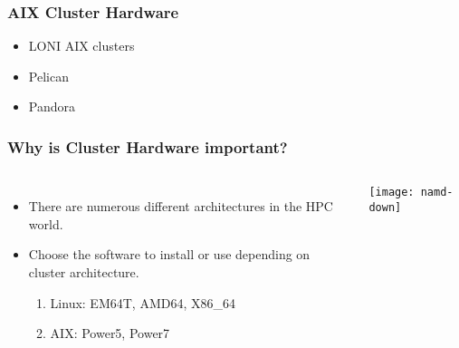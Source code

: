 \documentclass[slidestop,mathserif,compress,xcolor=svgnames,table]{beamer}
\newcommand*\vardiamond{\textcolor{tigerspurple}{%
  \ensuremath{\blacklozenge}}}
\begin{document}
\begin{frame}
\frametitle{\small AIX Cluster Hardware}
\begin{itemize}
\item LONI AIX clusters
\item Pelican
\item Pandora
\end{itemize}
\end{frame}

\begin{frame}
\frametitle{\small Why is Cluster Hardware important?} 
\begin{columns}
 \column{5cm}
\begin{itemize}
 \item There are numerous different architectures in the HPC world.
 \item Choose the software to install or use depending on cluster architecture.
 \begin{enumerate}
  \item Linux: EM64T, AMD64, X86\_64
  \item AIX: Power5, Power7
 \end{enumerate}
\end{itemize}
\column{7cm}
\vspace{-1cm}
\begin{center}
\texttt{[image: namd-down]}
\end{center}
\end{columns}
\end{frame}
\end{document}
